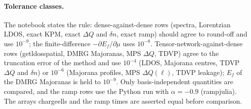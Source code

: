 \documentclass[11pt]{article}
\newcommand{\codeus}{\textunderscore\allowbreak}
\renewcommand{\code}[1]{{\ttfamily\let\_\codeus #1}}
\begin{document}
\paragraph{Tolerance classes.} The notebook states the rule: dense-against-dense rows (spectra, Lorentzian LDOS, exact KPM, exact $\Delta Q$ and $\delta n$, exact ramp) should agree to round-off and use $10^{-9}$; the finite-difference $-\partial E_f/\partial\mu$ uses $10^{-8}$. Tensor-network-against-dense rows (\code{get\_ldos\_spatial}, DMRG Majoranas, MPS $\Delta Q$, TDVP) agree to the truncation error of the method and use $10^{-4}$ (LDOS, Majorana centres, TDVP $\Delta Q$ and $\delta n$) or $10^{-6}$ (Majorana profiles, MPS $\Delta Q(\ell)$, TDVP leakage); $E_f$ of the DMRG Majoranas is held to $10^{-9}$. Only basis-independent quantities are compared, and the ramp rows use the Python run with $\alpha=-0.9$ (\code{ramp\_julia\_*}). The arrays \code{charge\_ells} and the ramp times are asserted equal before comparison.
\end{document}
